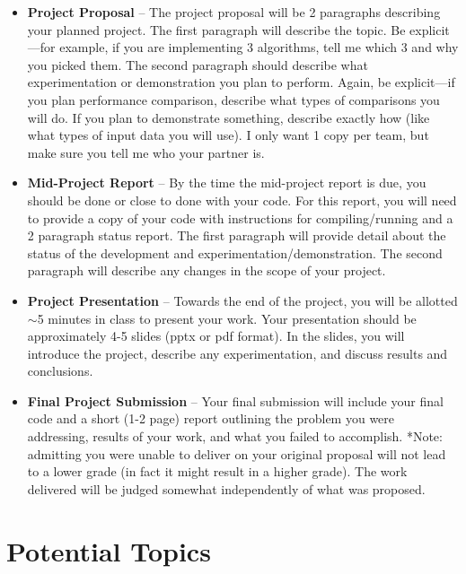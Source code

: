 \documentclass[a4paper,12pt]{article}
\begin{document}
\begin{itemize}
    \item \textbf{Project Proposal} -- The project proposal will be 2 paragraphs describing your planned project. The first paragraph will describe the topic. Be explicit---for example, if you are implementing 3 algorithms, tell me which 3 and why you picked them. The second paragraph should describe what experimentation or demonstration you plan to perform. Again, be explicit---if you plan performance comparison, describe what types of comparisons you will do. If you plan to demonstrate something, describe exactly how (like what types of input data you will use). I only want 1 copy per team, but make sure you tell me who your partner is.
    
    \item \textbf{Mid-Project Report} -- By the time the mid-project report is due, you should be done or close to done with your code. For this report, you will need to provide a copy of your code with instructions for compiling/running and a 2 paragraph status report. The first paragraph will provide detail about the status of the development and experimentation/demonstration. The second paragraph will describe any changes in the scope of your project.
    
    \item \textbf{Project Presentation} -- Towards the end of the project, you will be allotted $\sim$5 minutes in class to present your work. Your presentation should be approximately 4-5 slides (pptx or pdf format). In the slides, you will introduce the project, describe any experimentation, and discuss results and conclusions. 

    \item \textbf{Final Project Submission} -- Your final submission will include your final code and a short (1-2 page) report outlining the problem you were addressing, results of your work, and what you failed to accomplish. *Note: admitting you were unable to deliver on your original proposal will not lead to a lower grade (in fact it might result in a higher grade). The work delivered will be judged somewhat independently of what was proposed.
        
\end{itemize}


\section{Potential Topics}
\end{document}
